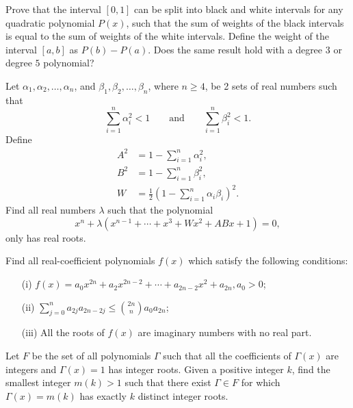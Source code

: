 \begin{question}[name={1995 China TST}]
    Prove that the interval $[0,1]$ can be split into black and white intervals for any quadratic polynomial $P(x)$, such that the sum of weights of the black intervals is equal to the sum of weights of the white intervals. Define the weight of the interval $[a,b]$ as $P(b) - P(a)$. Does the same result hold with a degree $3$ or degree $5$ polynomial?
\end{question}




\begin{question}[name={1996 China TST}]
    Let $\alpha_1, \alpha_2, \dots, \alpha_n$, and $\beta_1, \beta_2, \ldots, \beta_n$, where $n \geq 4$, be 2 sets of real numbers such that 
    \[\sum_{i=1}^{n} \alpha_i^2 < 1 \qquad \text{and} \qquad \sum_{i=1}^{n} \beta_i^2 < 1.\]
    Define
    \begin{align*}
        A^2 &= 1 - \sum_{i=1}^{n} \alpha_i^2,\\ 
        B^2 &= 1 - \sum_{i=1}^{n} \beta_i^2,\\
        W &= \frac{1}{2} (1 - \sum_{i=1}^{n} \alpha_i \beta_i)^2.
    \end{align*}
    Find all real numbers $\lambda$ such that the polynomial \[x^n + \lambda (x^{n-1} + \cdots + x^3 + Wx^2 + ABx + 1) = 0,\] only has real roots.
\end{question}




\begin{question}[name={1997 China TST}]
    Find all real-coefficient polynomials $f(x)$ which satisfy the following conditions:
    \begin{itemize}
        \item[(i)]  $f(x) = a_0 x^{2n} + a_2 x^{2n - 2} + \cdots + a_{2n - 2} x^2 + a_{2n}, a_0 > 0$;
        \item[(ii)] $\displaystyle \sum_{j=0}^n a_{2j} a_{2n - 2j} \leq \binom{2n}{n} a_0 a_{2n}$;
        \item[(iii)] All the roots of $f(x)$ are imaginary numbers with no real part.
    \end{itemize}
\end{question}




\begin{question}[name={2000 China TST}]
    Let $F$ be the set of all polynomials $\Gamma$ such that all the coefficients of $\Gamma (x)$ are integers and $\Gamma (x) = 1$ has integer roots. Given a positive integer $k$, find the smallest integer $m(k) > 1$ such that there exist $\Gamma \in F$ for which $\Gamma (x) = m(k)$ has exactly $k$ distinct integer roots.
\end{question}




